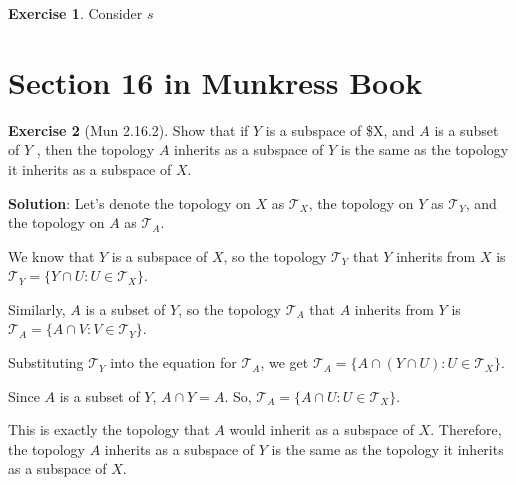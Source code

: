 \documentclass[
]{book}
\theoremstyle{definition}
\theoremstyle{definition}
\theoremstyle{definition}
\newtheorem{exercise}{Exercise}[chapter]
\theoremstyle{definition}
\theoremstyle{remark}
\begin{document}
\begin{exercise}
\protect\hypertarget{exr:unnamed-chunk-112}{}\label{exr:unnamed-chunk-112}Consider \(s\)
\end{exercise}

\hypertarget{section-16-in-munkress-book}{%
\section{Section 16 in Munkress Book}\label{section-16-in-munkress-book}}

\begin{exercise}[Mun 2.16.2]
\protect\hypertarget{exr:unnamed-chunk-113}{}\label{exr:unnamed-chunk-113}Show that if \(Y\) is a subspace of \$X, and \(A\) is a subset of \(Y\) , then the topology \(A\) inherits as a subspace of \(Y\) is the same as the topology it inherits as a subspace of \(X\).
\end{exercise}

\textbf{Solution}:
Let's denote the topology on \(X\) as \(\mathcal{T}_X\), the topology on \(Y\) as \(\mathcal{T}_Y\), and the topology on \(A\) as \(\mathcal{T}_A\).

We know that \(Y\) is a subspace of \(X\), so the topology \(\mathcal{T}_Y\) that \(Y\) inherits from \(X\) is \(\mathcal{T}_Y = \{ Y \cap U : U \in \mathcal{T}_X \}\).

Similarly, \(A\) is a subset of \(Y\), so the topology \(\mathcal{T}_A\) that \(A\) inherits from \(Y\) is \(\mathcal{T}_A = \{ A \cap V : V \in \mathcal{T}_Y \}\).

Substituting \(\mathcal{T}_Y\) into the equation for \(\mathcal{T}_A\), we get \(\mathcal{T}_A = \{ A \cap (Y \cap U) : U \in \mathcal{T}_X \}\).

Since \(A\) is a subset of \(Y\), \(A \cap Y = A\). So, \(\mathcal{T}_A = \{ A \cap U : U \in \mathcal{T}_X \}\).

This is exactly the topology that \(A\) would inherit as a subspace of \(X\). Therefore, the topology \(A\) inherits as a subspace of \(Y\) is the same as the topology it inherits as a subspace of \(X\).
\end{document}

